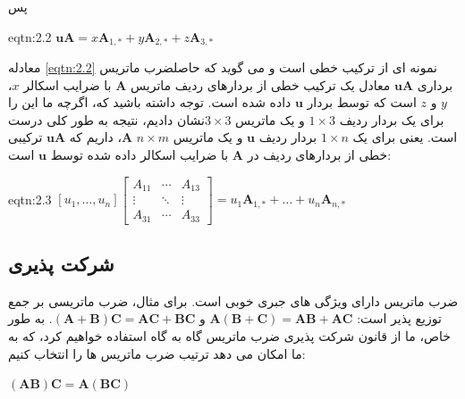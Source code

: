 {\begin{spacing}{1.5}
        پس

        \begin{eqtn}{eqtn:2.2}
            \centering
            $\textbf{uA}=x\textbf{A}_{1,*}+y\textbf{A}_{2,*}+z\textbf{A}_{3,*}$
        \end{eqtn}

        معادله \ref{eqtn:2.2} نمونه ای از ترکیب خطی است و
        می گوید که حاصلضرب ماتریس برداری $\textbf{uA}$ معادل یک ترکیب خطی از بردارهای ردیف ماتریس $\textbf{A}$ با ضرایب اسکالر $x$، $y$ و $z$ است که توسط بردار $\textbf{u}$ داده شده است.
        توجه داشته باشید که، اگرچه ما این را برای یک بردار ردیف $1\times 3$ و یک ماتریس $3\times 3$نشان دادیم، نتیجه به طور کلی درست است.
        یعنی برای یک $1\times n$ بردار ردیف $\textbf{u}$ و یک ماتریس $n\times m$ $\textbf{A}$، داریم که $\textbf{uA}$ ترکیبی خطی از بردارهای ردیف در $\textbf{A}$ با ضرایب اسکالر داده شده توسط $\textbf{u}$ است:

        \begin{eqtn}{eqtn:2.3}
            \centering
            $[u_{1},\dots,u_{n}]\begin{bmatrix}
                                    A_{11} & \cdots & A_{13} \\
                                    \vdots & \ddots & \vdots \\
                                    A_{31} & \cdots & A_{33}
            \end{bmatrix}=u_{1}\textbf{A}_{1,*}+\dots+u_{n}\textbf{A}_{n,*}$
        \end{eqtn}
    \end{spacing}
}

\subsection{\textbf{شرکت پذیری}}
{
    \Large
    \begin{spacing}{1.5}
        ضرب ماتریس دارای ویژگی های جبری خوبی است. برای مثال، ضرب ماتریسی بر جمع توزیع پذیر است: $\textbf{A}(\textbf{B}+\textbf{C})=\textbf{AB}+\textbf{AC}$ و $(\textbf{A}+\textbf{B})\textbf{C}=\textbf{AC}+\textbf{BC}$.
        به طور خاص، ما از قانون شرکت پذیری ضرب ماتریس گاه به گاه استفاده خواهیم کرد، که به ما امکان می دهد ترتیب ضرب ماتریس ها را انتخاب کنیم:

        \begin{center}
            $(\textbf{AB})\textbf{C}=\textbf{A}(\textbf{BC})$
        \end{center}

    \end{spacing}
}


